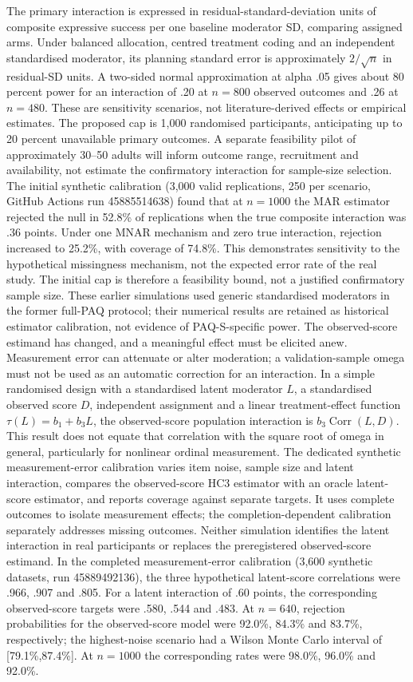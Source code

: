 \documentclass[11pt,a4paper]{article}
\begin{document}
The primary interaction is expressed in residual-standard-deviation units of composite expressive success per one baseline moderator SD, comparing assigned arms. Under balanced allocation, centred treatment coding and an independent standardised moderator, its planning standard error is approximately \(2/\sqrt{n}\) in residual-SD units. A two-sided normal approximation at alpha .05 gives about 80 percent power for an interaction of .20 at \(n=800\) observed outcomes and .26 at \(n=480\). These are sensitivity scenarios, not literature-derived effects or empirical estimates. The proposed cap is 1,000 randomised participants, anticipating up to 20 percent unavailable primary outcomes. A separate feasibility pilot of approximately 30--50 adults will inform outcome range, recruitment and availability, not estimate the confirmatory interaction for sample-size selection. The initial synthetic calibration (3,000 valid replications, 250 per scenario, GitHub Actions run 45885514638) found that at \(n=1000\) the MAR estimator rejected the null in 52.8\% of replications when the true composite interaction was .36 points. Under one MNAR mechanism and zero true interaction, rejection increased to 25.2\%, with coverage of 74.8\%. This demonstrates sensitivity to the hypothetical missingness mechanism, not the expected error rate of the real study. The initial cap is therefore a feasibility bound, not a justified confirmatory sample size. These earlier simulations used generic standardised moderators in the former full-PAQ protocol; their numerical results are retained as historical estimator calibration, not evidence of PAQ-S-specific power. The observed-score estimand has changed, and a meaningful effect must be elicited anew. Measurement error can attenuate or alter moderation; a validation-sample omega must not be used as an automatic correction for an interaction. In a simple randomised design with a standardised latent moderator \(L\), a standardised observed score \(D\), independent assignment and a linear treatment-effect function \(\tau(L)=b_1+b_3 L\), the observed-score population interaction is \(b_3\operatorname{Corr}(L,D)\). This result does not equate that correlation with the square root of omega in general, particularly for nonlinear ordinal measurement. The dedicated synthetic measurement-error calibration varies item noise, sample size and latent interaction, compares the observed-score HC3 estimator with an oracle latent-score estimator, and reports coverage against separate targets. It uses complete outcomes to isolate measurement effects; the completion-dependent calibration separately addresses missing outcomes. Neither simulation identifies the latent interaction in real participants or replaces the preregistered observed-score estimand. In the completed measurement-error calibration (3,600 synthetic datasets, run 45889492136), the three hypothetical latent-score correlations were .966, .907 and .805. For a latent interaction of .60 points, the corresponding observed-score targets were .580, .544 and .483. At \(n=640\), rejection probabilities for the observed-score model were 92.0\%, 84.3\% and 83.7\%, respectively; the highest-noise scenario had a Wilson Monte Carlo interval of [79.1\%,87.4\%]. At \(n=1000\) the corresponding rates were 98.0\%, 96.0\% and 92.0\%. 
\end{document}
